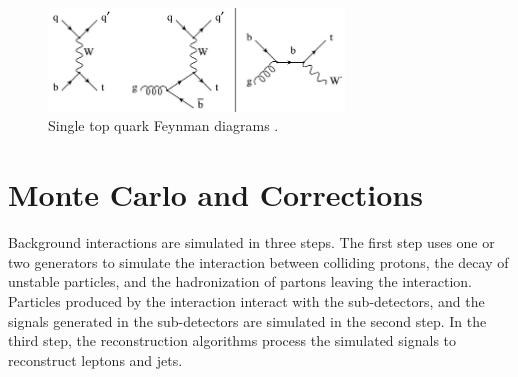 \begin{figure}[h]
	\centering
	\includegraphics[width=0.7\textwidth]{figures/singleTopQuarkFeynDiagrams.png}
	\caption{Single top quark Feynman diagrams \cite{singleTopQrkDiagrams}.}
	\label{fig:singleTopDiags}
\end{figure}

\clearpage

\section{Monte Carlo and Corrections}
\label{sec:MC}
Background interactions are simulated in three steps.  The first step uses one or two \MC generators to simulate the interaction between 
colliding protons, the decay of unstable particles, and the hadronization of partons leaving the interaction.  Particles produced by the 
interaction interact with the sub-detectors, and the signals generated in the sub-detectors are simulated in the second step.  In the third 
step, the reconstruction algorithms process the simulated signals to reconstruct leptons and jets.

